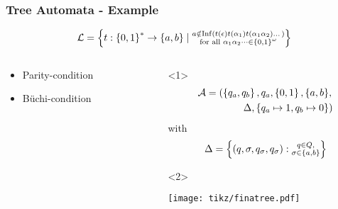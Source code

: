 \documentclass{beamer}
\begin{document}
  \begin{frame}
    \frametitle{Tree Automata - Example}
    \begin{equation*}
      \mathcal{L} = \left\{
        t:\left\{0,1\right\}^{*}\rightarrow\left\{a,b\right\}\mid\substack{
          a\notin \operatorname{Inf}(t(\epsilon)t(\alpha_{1})t(\alpha_{1}\alpha_{2})\dots)\\
          \text{for all }\alpha_{1}\alpha_{2}\dots\in\left\{0,1\right\}^{\omega} 
        }
      \right\}
    \end{equation*}
      \begin{columns}
        \begin{column}{0.4\textwidth}
          \vspace{-3cm}
          \begin{itemize}
            \item Parity-condition \checkmark
            \item Büchi-condition 
          \end{itemize}
        \end{column}
        \begin{column}{0.6\textwidth}
          \begin{overlayarea}{\textwidth}{0.8\textheight}
            \begin{onlyenv}<1>
              \begin{align*}
                \mathcal{A} = (\left\{q_{a}, q_{b}\right\}, q_{a}, \left\{0,1\right\},
                \left\{a, b\right\}&,\\
                \Delta, \left\{q_{a}\mapsto 1, q_{b}\mapsto 0\right\}&)
              \end{align*}
              with
              \begin{equation*}
                \Delta = \left\{
                  \left(q, \sigma, q_{\sigma}, q_{\sigma}\right):\substack{
                    q\in Q,\\
                    \sigma\in\left\{a,b\right\}
                  }
                \right\}
              \end{equation*}
            \end{onlyenv}
            \begin{onlyenv}<2>
              \begin{center}
                  \texttt{[image: tikz/finatree.pdf]}
              \end{center}
            \end{onlyenv}
          \end{overlayarea}
        \end{column}
      \end{columns}
  \end{frame}
\end{document}

